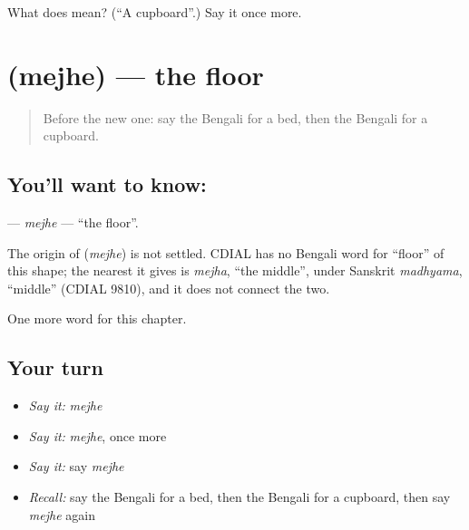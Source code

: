 \begin{tcolorbox}[breakable,colback=teal!4,colframe=teal!35!black,title={Before you move on}]
What does  mean? (\textquotedblleft{}A cupboard\textquotedblright{}.) Say it once more.
\end{tcolorbox}
\section[\texorpdfstring{\bn{মেঝে} (mejhe)}{মেঝে (mejhe)}]{ (mejhe) — the floor}

\label{lesson:BN-C61-mejhe}



\begin{quote}
Before the new one: say the Bengali for a bed, then the Bengali for a cupboard.
\end{quote}

\subsection*{You'll want to know: }
\textbf{} — \emph{mejhe} — \textquotedblleft{}the floor\textquotedblright{}.

\begin{cousinweb}
The origin of \textbf{} (\emph{mejhe}) is not settled. CDIAL has no Bengali word for \textquotedblleft{}floor\textquotedblright{} of this shape; the nearest it gives is \emph{mejha}, \textquotedblleft{}the middle\textquotedblright{}, under Sanskrit \emph{madhyama}, \textquotedblleft{}middle\textquotedblright{} (CDIAL 9810), and it does not connect the two.
\end{cousinweb}

\begin{grammarlens}[title={What you've built}]
One more word for this chapter.
\end{grammarlens}

\subsection*{Your turn}
\begin{itemize}
\raggedright
  \item \emph{Say it:} \emph{mejhe}
  \item \emph{Say it:} \emph{mejhe}, once more
  \item \emph{Say it:} say \emph{mejhe}
  \item \emph{Recall:} say the Bengali for a bed, then the Bengali for a cupboard, then say \emph{mejhe} again
\end{itemize}

